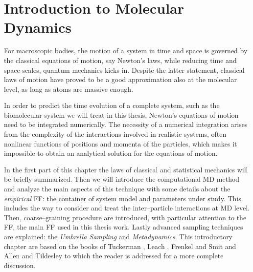 \chapter{Introduction to Molecular Dynamics}
\label{chap:methods}
For macroscopic bodies, the motion of a system in time and space is governed by the classical equations of
motion, say Newton’s laws, while reducing time and space scales, quantum mechanics kicks in. Despite the latter
statement, classical laws of motion have proved to be a good approximation also at the molecular level, as long
as atoms are massive enough.

In order to predict the time evolution of a complete system, such as the biomolecular system we will treat in
this thesis, Newton’s equations of motion need to be integrated numerically. The necessity of a numerical
integration arises from the complexity of the interactions involved in realistic systems, often nonlinear
functions of positions and momenta of the particles, which makes it impossible to obtain an analytical solution
for the equations of motion.

In the first part of this chapter the laws of classical and statistical mechanics will be briefly summarized.
Then we will introduce the computational \acf{MD} method and analyze the main aspects of this technique with some
details about the \textit{empirical} \ac{FF}: the container of system model and parameters under study. This
includes the way to consider and treat the inter--particle interactions at \ac{MD} level. Then, coarse--graining
procedure are introduced, with particular attention to the \martini \ac{FF}, the main \ac{FF} used in this thesis
work. Lastly advanced sampling techniques are explained: the \textit{Umbrella Sampling} and
\textit{Metadynamics}. This introductory chapter are based on the books of Tuckerman \cite{Tuckerman}, Leach
\cite{Leach}, Frenkel and Smit \cite{Frenkel} and Allen and Tildesley \cite{Allen} to which the reader is
addressed for a more complete discussion.

